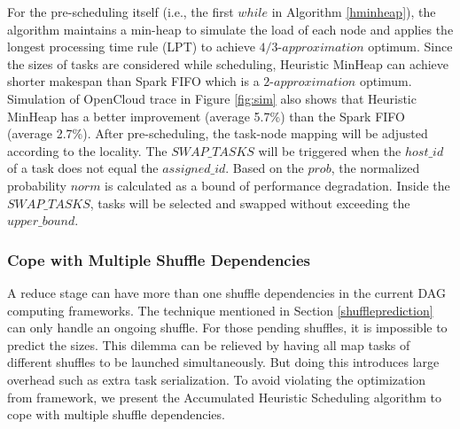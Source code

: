 For the pre-scheduling itself (i.e., the first $while$ in Algorithm \ref{hminheap}), the algorithm maintains a min-heap to simulate the load of each node 
and applies the longest processing time rule (LPT) \cite{design} to achieve $4/3\text{-}approximation$ optimum. 
Since the sizes of tasks are considered while scheduling, Heuristic MinHeap can achieve shorter makespan than Spark FIFO which is a $2\text{-}approximation$ optimum. 
Simulation of OpenCloud trace in Figure \ref{fig:sim} also shows that Heuristic MinHeap has a better improvement (average 5.7\%) than the Spark FIFO (average 2.7\%).
After pre-scheduling, the task-node mapping will be adjusted according to the locality. 
The $SWAP\_TASKS$ will be triggered when the $host\_id$ of a task does not equal the $assigned\_id$.
Based on the $prob$, the normalized probability $norm$ is calculated as a bound of performance degradation. 
Inside the $SWAP\_TASKS$, tasks will be selected and swapped without exceeding the $upper\_bound$. 

\subsubsection{Cope with Multiple Shuffle Dependencies}
\ifrevision
{}
\fi
A reduce stage can have more than one shuffle dependencies in the current DAG computing frameworks. 
The technique mentioned in Section \ref{shuffleprediction} can only handle an ongoing shuffle. 
For those pending shuffles, it is impossible to predict the sizes. 
This dilemma can be relieved by having all map tasks of different shuffles to be launched simultaneously. 
But doing this introduces large overhead such as extra task serialization. 
To avoid violating the optimization from framework, we present the Accumulated Heuristic Scheduling algorithm to cope with multiple shuffle dependencies.

